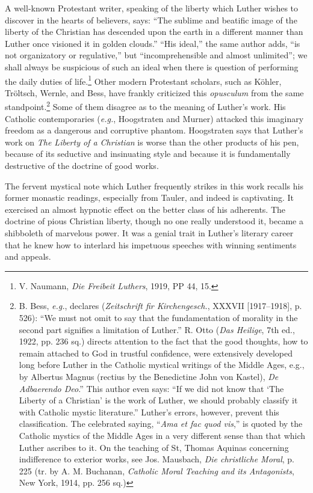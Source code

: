 A well-known Protestant writer, speaking of the liberty which
Luther wishes to discover in the hearts of believers, says: “The sublime
and beatific image of the liberty of the Christian has descended
upon the earth in a different manner than Luther once visioned it in
golden clouds.” “His ideal,” the same author adds, “is not organizatory
or regulative,” but “incomprehensible and almost unlimited”;
we shall always be suspicious of such an ideal when there is question of
performing the daily duties of life.\footnote
{V. Naumann, \textit{Die Freibeit Luthers}, 1919, PP 44, 15.}
Other modern Protestant
scholars, such as Köhler, Tröltsch, Wernle, and Bess, have frankly
criticized this \textit{opusculum} from the same standpoint.\footnote
{B. Bess, \textit{e.g.}, declares (\textit{Zeitschrift fir Kirchengesch.}, XXXVII [1917--1918], p. 526):
“We must not omit to say that the fundamentation of morality in the second part signifies
a limitation of Luther.” R. Otto (\textit{Das Heilige}, 7th ed., 1922, pp. 236 sq.) directs
attention to the fact that the good thoughts, how to remain attached to God in trustful
confidence, were extensively developed long before Luther in the Catholic mystical writings
of the Middle Ages, e.g., by Albertus Magnus (rectius by the Benedictine John von Kastel),
\textit{De Adbaerendo Deo}.” This author even says: “If we did not know that ‘The Liberty of a
Christian’ is the work of Luther, we should probably classify it with Catholic mystic
literature.” Luther’s errors, however, prevent this classification. The celebrated saying,
“\textit{Ama et fac quod vis},” is quoted by the Catholic mystics of the Middle Ages in a very
different sense than that which Luther ascribes to it. On the teaching of St, Thomas
Aquinas concerning indifference to exterior works, see Jos. Mausbach, \textit{Die christliche Moral},
p. 225 (tr. by A. M. Buchanan, \textit{Catholic Moral Teaching and its Antagonists}, New York,
1914, pp. 256 sq.)}
Some of them disagree as to the meaning of Luther’s work. His Catholic contemporaries
(\textit{e.g.}, Hoogstraten and Murner) attacked this imaginary
freedom as a dangerous and corruptive phantom. Hoogstraten says
that Luther’s work on \textit{The Liberty of a Christian} is worse than the
other products of his pen, because of its seductive and insinuating
style and because it is fundamentally destructive of the doctrine of
good works.

The fervent mystical note which Luther frequently strikes in this
work recalls his former monastic readings, especially from Tauler,
and indeed is captivating. It exercised an almost hypnotic effect on
the better class of his adherents. The doctrine of pious Christian liberty,
though no one really understood it, became a shibboleth of marvelous
power. It was a genial trait in Luther’s literary career that he
knew how to interlard his impetuous speeches with winning sentiments
and appeals.

